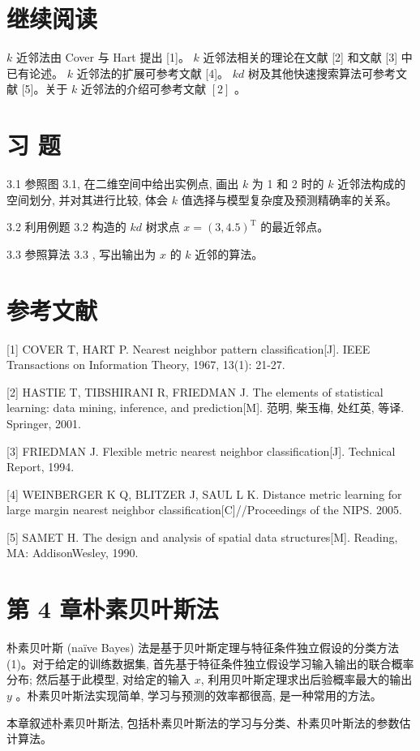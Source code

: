 \documentclass[10pt]{article}
\begin{document}
\section*{继续阅读}
$k$ 近邻法由 Cover 与 Hart 提出 [1]。 $k$ 近邻法相关的理论在文献 [2] 和文献 [3] 中已有论述。 $k$ 近邻法的扩展可参考文献 [4]。 $k d$ 树及其他快速搜索算法可参考文献 [5]。关于 $k$ 近邻法的介绍可参考文献 $[2]$ 。

\section*{习 题}
3.1 参照图 3.1, 在二维空间中给出实例点, 画出 $k$ 为 1 和 2 时的 $k$ 近邻法构成的空间划分, 并对其进行比较, 体会 $k$ 值选择与模型复杂度及预测精确率的关系。

3.2 利用例题 3.2 构造的 $k d$ 树求点 $x=(3,4.5)^{\mathrm{T}}$ 的最近邻点。

3.3 参照算法 3.3 , 写出输出为 $x$ 的 $k$ 近邻的算法。

\section*{参考文献}
[1] COVER T, HART P. Nearest neighbor pattern classification[J]. IEEE Transactions on Information Theory, 1967, 13(1): 21-27.

[2] HASTIE T, TIBSHIRANI R, FRIEDMAN J. The elements of statistical learning: data mining, inference, and prediction[M]. 范明, 柴玉梅, 处红英, 等译. Springer, 2001.

[3] FRIEDMAN J. Flexible metric nearest neighbor classification[J]. Technical Report, 1994.

[4] WEINBERGER K Q, BLITZER J, SAUL L K. Distance metric learning for large margin nearest neighbor classification[C]//Proceedings of the NIPS. 2005.

[5] SAMET H. The design and analysis of spatial data structures[M]. Reading, MA: AddisonWesley, 1990.

\section*{第 4 章朴素贝叶斯法}
朴素贝叶斯 (naïve Bayes) 法是基于贝叶斯定理与特征条件独立假设的分类方法 (1)。对于给定的训练数据集, 首先基于特征条件独立假设学习输入输出的联合概率分布; 然后基于此模型, 对给定的输入 $x$, 利用贝叶斯定理求出后验概率最大的输出 $y$ 。朴素贝叶斯法实现简单, 学习与预测的效率都很高, 是一种常用的方法。

本章叙述朴素贝叶斯法, 包括朴素贝叶斯法的学习与分类、朴素贝叶斯法的参数估计算法。
\end{document}
